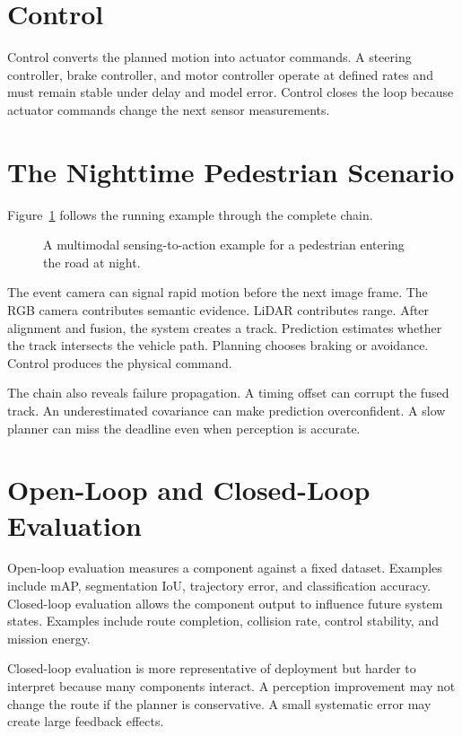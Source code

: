 \section{Control}

Control converts the planned motion into actuator commands. A steering controller, brake controller, and motor controller operate at defined rates and must remain stable under delay and model error. Control closes the loop because actuator commands change the next sensor measurements.

\section{The Nighttime Pedestrian Scenario}

Figure~\ref{fig:pedestrian-scenario} follows the running example through the complete chain.

\begin{figure}[H]
    \centering
    \resizebox{\textwidth}{!}{}
    \caption{A multimodal sensing-to-action example for a pedestrian entering the road at night.}
    \label{fig:pedestrian-scenario}
\end{figure}

The event camera can signal rapid motion before the next image frame. The RGB camera contributes semantic evidence. LiDAR contributes range. After alignment and fusion, the system creates a track. Prediction estimates whether the track intersects the vehicle path. Planning chooses braking or avoidance. Control produces the physical command.

The chain also reveals failure propagation. A timing offset can corrupt the fused track. An underestimated covariance can make prediction overconfident. A slow planner can miss the deadline even when perception is accurate.

\section{Open-Loop and Closed-Loop Evaluation}

Open-loop evaluation measures a component against a fixed dataset. Examples include mAP, segmentation IoU, trajectory error, and classification accuracy. Closed-loop evaluation allows the component output to influence future system states. Examples include route completion, collision rate, control stability, and mission energy.

Closed-loop evaluation is more representative of deployment but harder to interpret because many components interact. A perception improvement may not change the route if the planner is conservative. A small systematic error may create large feedback effects.

